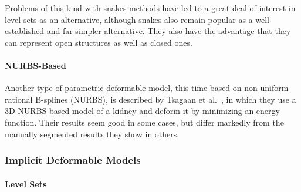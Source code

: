
Problems of this kind with snakes methods have led to a great deal of interest in level sets as an alternative, although snakes also remain popular as a well-established and far simpler alternative. They also have the advantage that they can represent open structures as well as closed ones.


\paragraph{NURBS-Based}

Another type of parametric deformable model, this time based on non-uniform rational B-splines (NURBS), is described by Tsagaan et al.\ \cite{tsagaan02}, in which they use a 3D NURBS-based model of a kidney and deform it by minimizing an energy function. Their results seem good in some cases, but differ markedly from the manually segmented results they show in others.

\subsubsection{Implicit Deformable Models}

\paragraph{Level Sets}


